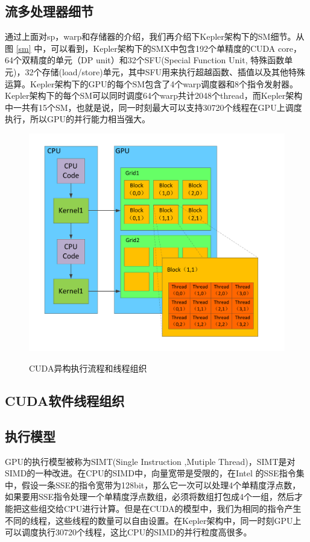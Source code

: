 \subsection{流多处理器细节}
通过上面对sp，warp和存储器的介绍，我们再介绍下Kepler架构下的SM细节。从图 \ref{sm} 中，可以看到，Kepler架构下的SMX中包含192个单精度的CUDA core，64个双精度的单元（DP unit）和32个SFU(Special Function Unit, 特殊函数单元)，32个存储(load/store)单元，其中SFU用来执行超越函数、插值以及其他特殊运算。Kepler架构下的GPU的每个SM包含了4个warp调度器和8个指令发射器。 Kepler架构下的每个SM可以同时调度64个warp共计2048个thread，而Kepler架构中一共有15个SM，也就是说，同一时刻最大可以支持30720个线程在GPU上调度执行，所以GPU的并行能力相当强大。
\begin{figure}
\setlength{\belowcaptionskip}{-0.5cm}
\begin{center}
{\includegraphics[width=0.7 \textwidth]{figures/block.pdf}}
\end{center}
\caption{{\footnotesize{CUDA异构执行流程和线程组织}}}
\label{ktz}
\end{figure}
\subsection{CUDA软件线程组织}
\subsection{执行模型}
GPU的执行模型被称为SIMT(Single Instruction ,Mutiple Thread)，SIMT是对SIMD的一种改进。在CPU的SIMD中，向量宽带是受限的，在Intel 的SSE指令集中，假设一条SSE的指令宽带为128bit，那么它一次可以处理4个单精度浮点数，如果要用SSE指令处理一个单精度浮点数组，必须将数组打包成4个一组，然后才能把这些组交给CPU进行计算。但是在CUDA的模型中，我们为相同的指令产生不同的线程，这些线程的数量可以自由设置。在Kepler架构中，同一时刻GPU上可以调度执行30720个线程，这比CPU的SIMD的并行粒度高很多。

